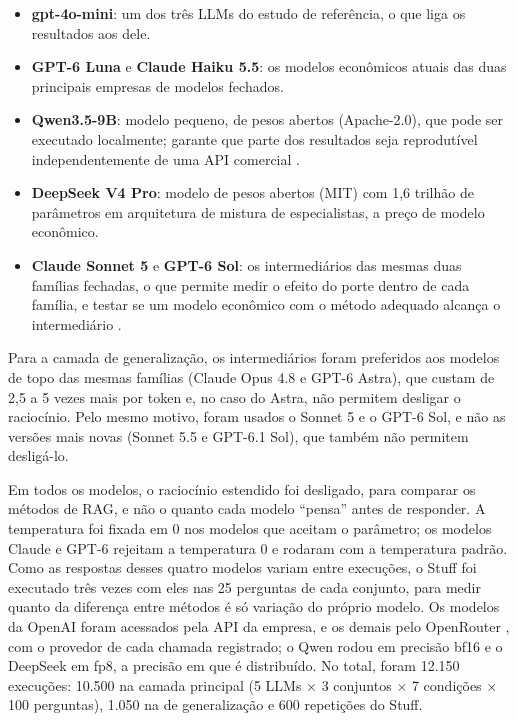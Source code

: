 \begin{itemize}
  \item \textbf{gpt-4o-mini}: um dos três LLMs do estudo de referência, o que liga os resultados aos dele.
  \item \textbf{GPT-6 Luna} e \textbf{Claude Haiku 5.5}: os modelos econômicos atuais das duas principais empresas de modelos fechados.
  \item \textbf{Qwen3.5-9B}: modelo pequeno, de pesos abertos (Apache-2.0), que pode ser executado localmente; garante que parte dos resultados seja reprodutível independentemente de uma API comercial \cite{palmer2024proprietary, chen2024chatgptbehavior}.
  \item \textbf{DeepSeek V4 Pro}: modelo de pesos abertos (MIT) com 1,6 trilhão de parâmetros em arquitetura de mistura de especialistas, a preço de modelo econômico.
  \item \textbf{Claude Sonnet 5} e \textbf{GPT-6 Sol}: os intermediários das mesmas duas famílias fechadas, o que permite medir o efeito do porte dentro de cada família, e testar se um modelo econômico com o método adequado alcança o intermediário \cite{chen2023frugalgpt}.
\end{itemize}

Para a camada de generalização, os intermediários foram preferidos aos modelos de topo das mesmas famílias (Claude Opus 4.8 e GPT-6 Astra), que custam de 2,5 a 5 vezes mais por token e, no caso do Astra, não permitem desligar o raciocínio. Pelo mesmo motivo, foram usados o Sonnet 5 e o GPT-6 Sol, e não as versões mais novas (Sonnet 5.5 e GPT-6.1 Sol), que também não permitem desligá-lo.

Em todos os modelos, o raciocínio estendido foi desligado, para comparar os métodos de RAG, e não o quanto cada modelo ``pensa'' antes de responder. A temperatura foi fixada em 0 nos modelos que aceitam o parâmetro; os modelos Claude e GPT-6 rejeitam a temperatura 0 e rodaram com a temperatura padrão. Como as respostas desses quatro modelos variam entre execuções, o Stuff foi executado três vezes com eles nas 25 perguntas de cada conjunto, para medir quanto da diferença entre métodos é só variação do próprio modelo. Os modelos da OpenAI foram acessados pela API da empresa, e os demais pelo OpenRouter \cite{openrouter2026}, com o provedor de cada chamada registrado; o Qwen rodou em precisão bf16 e o DeepSeek em fp8, a precisão em que é distribuído. No total, foram 12.150 execuções: 10.500 na camada principal (5 LLMs $\times$ 3 conjuntos $\times$ 7 condições $\times$ 100 perguntas), 1.050 na de generalização e 600 repetições do Stuff.

